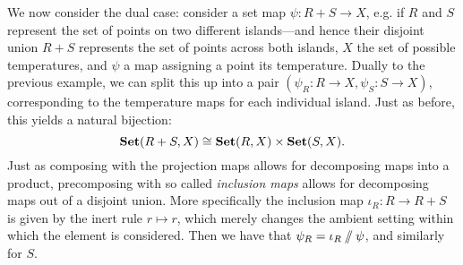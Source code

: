 We now consider the dual case: consider a set map $\psi:R+S\to X$, e.g. if $R$ and $S$ represent the set of points on two different islands---and hence their disjoint union $R+S$ represents the set of points across both islands, $X$ the set of possible temperatures, and $\psi$ a map assigning a point its temperature. Dually to the previous example, we can split this up into a pair $(\psi_R:R\to X,\psi_S:S\to X)$, corresponding to the temperature maps for each individual island. Just as before, this yields a natural bijection:
\[\mathbf{Set}(R+S,X)\cong\mathbf{Set}(R,X)\times\mathbf{Set}(S,X).\]
Just as composing with the projection maps allows for decomposing maps into a product, precomposing with so called \emph{inclusion maps} allows for decomposing maps out of a disjoint union. More specifically the inclusion map $\iota_R:R\to R+S$ is given by the inert rule $r\mapsto r$, which merely changes the ambient setting within which the element is considered. Then we have that $\psi_R = \iota_R\sslash\psi$, and similarly for $S$.

